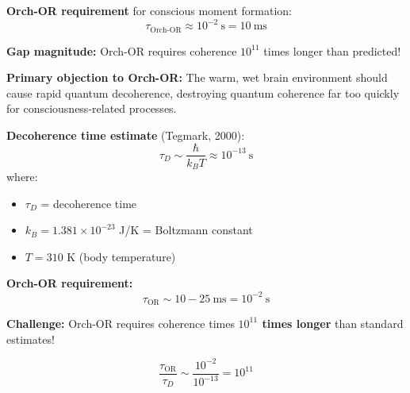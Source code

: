 \textbf{Orch-OR requirement} for conscious moment formation:
\begin{equation}
\label{eq:orchor-time}
\tau_{\text{Orch-OR}} \approx 10^{-2}~\text{s} = 10~\text{ms}
\end{equation}

\textbf{Gap magnitude:} Orch-OR requires coherence $10^{11}$ times longer than predicted!

\begin{warningbox}
\textbf{Primary objection to Orch-OR:} The warm, wet brain environment should cause rapid quantum decoherence, destroying quantum coherence far too quickly for consciousness-related processes.
\end{warningbox}

\textbf{Decoherence time estimate} (Tegmark, 2000):
\begin{equation}
\label{eq:decoherence-time-tegmark}
\tau_D \sim \frac{\hbar}{k_B T} \approx 10^{-13}~\text{s}
\end{equation}
where:
\begin{itemize}
\item $\tau_D$ = decoherence time
\item $k_B = 1.381 \times 10^{-23}$ J/K = Boltzmann constant
\item $T = 310$ K (body temperature)
\end{itemize}

\textbf{Orch-OR requirement:}
\begin{equation}
\label{eq:orch-or-time}
\tau_{\text{OR}} \sim 10-25~\text{ms} = 10^{-2}~\text{s}
\end{equation}

\textbf{Challenge:} Orch-OR requires coherence times \textbf{$10^{11}$ times longer} than standard estimates!

\begin{equation}
\label{eq:coherence-gap}
\frac{\tau_{\text{OR}}}{\tau_D} \sim \frac{10^{-2}}{10^{-13}} = 10^{11}
\end{equation}

